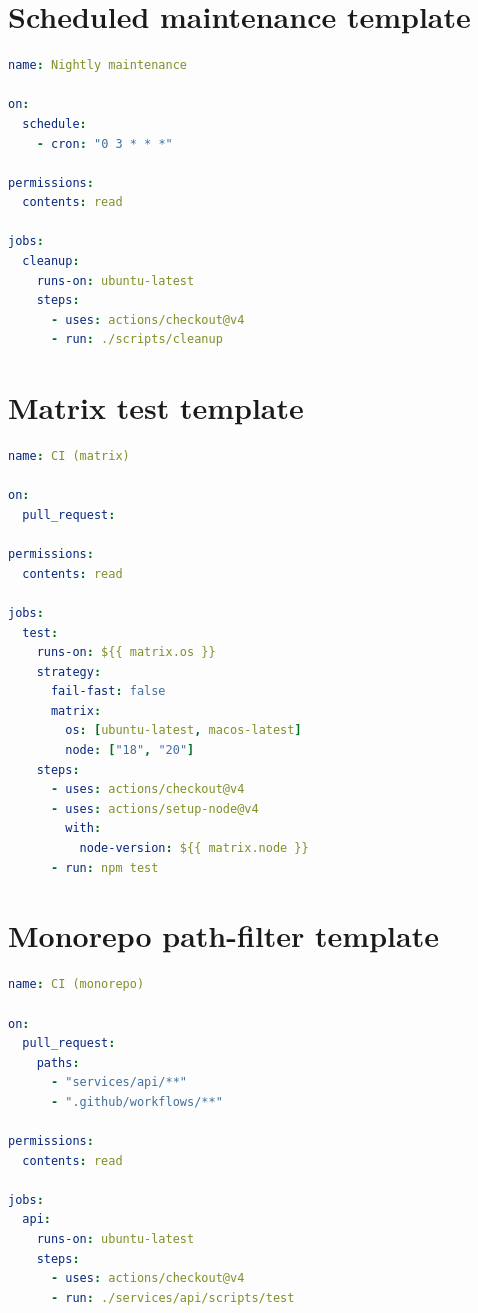 \section{Scheduled maintenance template}
\begin{lstlisting}[language=YAML]
name: Nightly maintenance

on:
  schedule:
    - cron: "0 3 * * *"

permissions:
  contents: read

jobs:
  cleanup:
    runs-on: ubuntu-latest
    steps:
      - uses: actions/checkout@v4
      - run: ./scripts/cleanup
\end{lstlisting}

\section{Matrix test template}
\begin{lstlisting}[language=YAML]
name: CI (matrix)

on:
  pull_request:

permissions:
  contents: read

jobs:
  test:
    runs-on: ${{ matrix.os }}
    strategy:
      fail-fast: false
      matrix:
        os: [ubuntu-latest, macos-latest]
        node: ["18", "20"]
    steps:
      - uses: actions/checkout@v4
      - uses: actions/setup-node@v4
        with:
          node-version: ${{ matrix.node }}
      - run: npm test
\end{lstlisting}

\section{Monorepo path-filter template}
\begin{lstlisting}[language=YAML]
name: CI (monorepo)

on:
  pull_request:
    paths:
      - "services/api/**"
      - ".github/workflows/**"

permissions:
  contents: read

jobs:
  api:
    runs-on: ubuntu-latest
    steps:
      - uses: actions/checkout@v4
      - run: ./services/api/scripts/test
\end{lstlisting}
